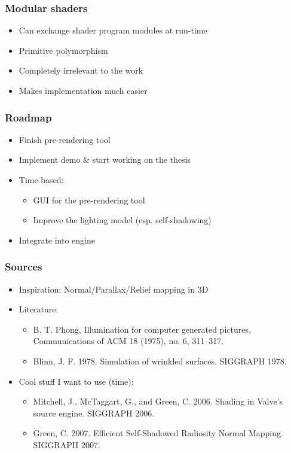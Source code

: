 \documentclass{beamer}
\begin{document}
\begin{frame}\frametitle{Modular shaders}

\begin{itemize}
\item
  Can exchange shader program modules at run-time
\item
  Primitive polymorphism
\item
  Completely irrelevant to the work
\item
  Makes implementation much easier
\end{itemize}

\end{frame}

\begin{frame}\frametitle{Roadmap}

\begin{itemize}
\item
  Finish pre-rendering tool
\item
  Implement demo \& start working on the thesis
\item
  Time-based:

  \begin{itemize}
  \item
    GUI for the pre-rendering tool
  \item
    Improve the lighting model (esp. self-shadowing)
  \end{itemize}
\item
  Integrate into engine
\end{itemize}

\end{frame}

\begin{frame}\frametitle{Sources}

\begin{itemize}
\item
  Inspiration: Normal/Parallax/Relief mapping in 3D
\item
  Literature:

  \begin{itemize}
  \item
    B. T. Phong, Illumination for computer generated pictures,
    Communications of ACM 18 (1975), no. 6, 311--317.
  \item
    Blinn, J. F. 1978. Simulation of wrinkled surfaces. SIGGRAPH 1978.
  \end{itemize}
\item
  Cool stuff I want to use (time):

  \begin{itemize}
  \item
    Mitchell, J., McTaggart, G., and Green, C. 2006. Shading in Valve's
    source engine. SIGGRAPH 2006.
  \item
    Green, C. 2007. Efficient Self-Shadowed Radiosity Normal Mapping.
    SIGGRAPH 2007.
  \end{itemize}
\end{itemize}

\end{frame}
\end{document}
